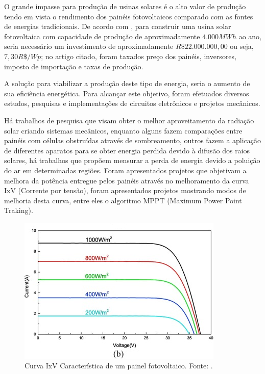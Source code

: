 O grande impasse para produção de usinas solares é o alto valor de produção tendo em vista o rendimento dos painéis fotovoltaicos comparado  com as fontes de energias tradicionais. De acordo com , para construir uma usina solar fotovoltaica com capacidade de produção de aproximadamente $4.000MWh$ ao ano, seria necessário um investimento de aproximadamente $R\$ 22.000.000,00$ ou seja, $7,30 R\$/Wp$; no artigo citado, foram taxados preço dos painéis, inversores, imposto de importação e taxas de produção.
 
A solução para viabilizar a produção deste tipo de energia, seria o aumento de sua eficiência energética. Para alcançar este objetivo, foram efetuados diversos estudos, pesquisas e implementações de circuitos eletrônicos e projetos mecânicos.
 
Há trabalhos de pesquisa que visam obter o melhor aproveitamento da radiação solar criando sistemas mecânicos, enquanto alguns fazem comparações entre painéis com células obstruídas através de sombreamento, outros fazem a aplicação de diferentes aparatos para se obter energia perdida devido à difusão dos raios solares, há trabalhos que propõem mensurar a perda de energia devido a poluição do ar em determinadas regiões. Foram apresentados projetos que objetivam a melhora da potência entregue pelos painéis através no melhoramento da curva IxV (Corrente por tensão), foram apresentados projetos mostrando modos de melhoria desta curva, entre eles o algoritmo MPPT (Maximum Power Point Traking).  

\FloatBarrier
\begin{figure}[htbp]
	\centering
	\includegraphics[scale=1.3]{imagens/IV_Gao}
	\caption{Curva IxV Característica de um painel fotovoltaico. Fonte:  \cite{GAO201852}.  }
	
	\label{fig:IVGao}
\end{figure}
\FloatBarrier

